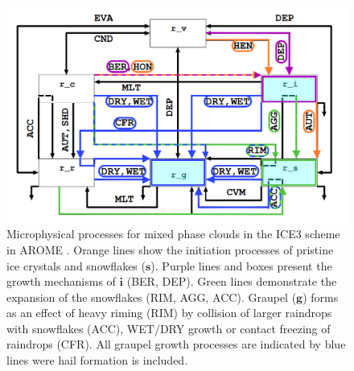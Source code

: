 \begin{figure}[t!]
	\centering
	\includegraphics[width=\textwidth]{./fig_MEPS/ICE3_scheme_copy}
	\caption{Microphysical processes for mixed phase clouds in the ICE3 scheme in AROME \citep[adapted from ][]{meteo_france_meso-nh_2009}. %
		Orange lines show the initiation processes of pristine ice crystals and snowflakes ($\mathbf{s}$). Purple lines and boxes present the growth mechanisms of $\mathbf{i}$ (BER, DEP). Green lines demonstrate the expansion of the snowflakes (RIM, AGG, ACC). Graupel ($\mathbf{g}$) forms as an effect of heavy riming (RIM) by collision of larger raindrops with snowflakes (ACC), WET/DRY growth or contact freezing of raindrops (CFR). All graupel growth processes are indicated by blue lines were hail formation is included. 
	}\label{fig:ICE3_scheme}
\end{figure}